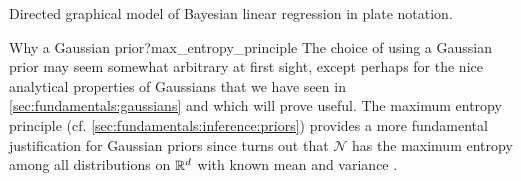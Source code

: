 \begin{marginfigure}
  \caption{Directed graphical model of Bayesian linear regression in plate notation.}\label{fig:blr}
\end{marginfigure}

\begin{rmk}{Why a Gaussian prior?}{max_entropy_principle}
  The choice of using a Gaussian prior may seem somewhat arbitrary at first sight, except perhaps for the nice analytical properties of Gaussians that we have seen in \cref{sec:fundamentals:gaussians} and which will prove useful.
  The maximum entropy principle (cf. \cref{sec:fundamentals:inference:priors}) provides a more fundamental justification for Gaussian priors since turns out that $\mathcal{N}$ has the maximum entropy among all distributions on $\mathbb{R}^d$ with known mean and variance .
\end{rmk}

